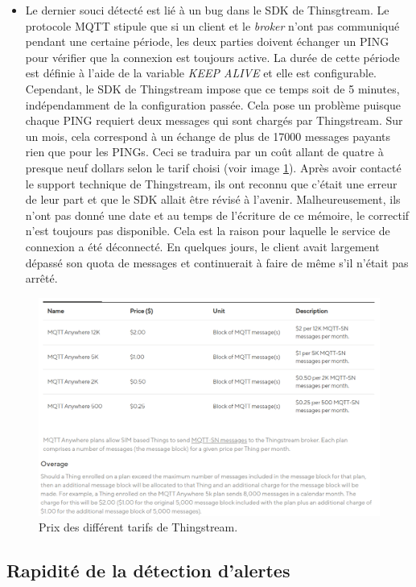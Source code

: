 \begin{itemize}
  \item Le dernier souci détecté est lié à un bug dans le SDK de Thinsgtream. Le protocole MQTT stipule que si un client et le \textit{broker} n'ont pas communiqué pendant une certaine période, les deux parties doivent échanger un PING pour vérifier que la connexion est toujours active. La durée de cette période est définie à l'aide de la variable \textit{KEEP ALIVE} et elle est configurable. Cependant, le SDK de Thingstream impose que ce temps soit de 5 minutes, indépendamment de la configuration passée. Cela pose un problème puisque chaque PING requiert deux messages qui sont chargés par Thingstream. Sur un mois, cela correspond à un échange de plus de 17000 messages payants rien que pour les PINGs. Ceci se traduira par un coût allant de quatre à presque neuf dollars selon le tarif choisi (voir image \ref{fig:thing_plans}). Après avoir contacté le support technique de Thingstream, ils ont reconnu que c'était une erreur de leur part et que le SDK allait être révisé à l'avenir. Malheureusement, ils n'ont pas donné une date et au temps de l'écriture de ce mémoire, le correctif n'est toujours pas disponible. Cela est la raison pour laquelle le service de connexion a été déconnecté. En quelques jours, le client avait largement dépassé son quota de messages et continuerait à faire de même s'il n'était pas arrêté.
\end{itemize}


\begin{figure}[ht!]
  \centering
  \includegraphics[width=\textwidth]{img/tests/thing_plans.png}
  \caption{Prix des différent tarifs de Thingstream.}
  \label{fig:thing_plans}
\end{figure}


\subsection{Rapidité de la détection d'alertes}


